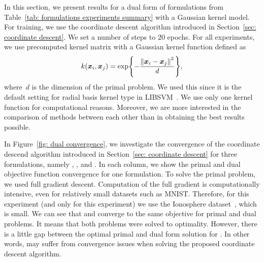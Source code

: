In this section, we present results for a dual form of formulations from Table~\ref{tab: formulations experiments summary} with a Gaussian kernel model. For training, we use the coordinate descent algorithm introduced in Section~\ref{sec: coordinate descent}. We set a number of steps to 20 epochs. For all experiments, we use precomputed kernel matrix with a Gaussian kernel function defined as 
\begin{equation*}
  k(\bm{x}_i, \bm{x}_j) = \exp\Brac[c]{- \frac{\norm{\bm{x}_i - \bm{x}_j}^2}{d}},
\end{equation*}
where~$d$ is the dimension of the primal problem. We used this since it is the default setting for radial basis kernel type in LIBSVM~\cite{chang2011libsvm}. We use only one kernel function for computational reasons. Moreover, we are more interested in the comparison of methods between each other than in obtaining the best results possible.

In Figure~\ref{fig: dual convergence}, we investigate the convergence of the coordinate descend algorithm introduced in Section~\ref{sec: coordinate descent} for three formulations, namely \TopPush, \TopPushK, and \PatMatNP. In each column, we show the primal and dual objective function convergence for one formulation. To solve the primal problem, we used full gradient descent. Computation of the full gradient is computationally intensive, even for relatively small datasets such as MNIST. Therefore, for this experiment (and only for this experiment) we use the Ionosphere dataset~\cite{sigillito1989classification}, which is small. We can see that \TopPush and \TopPushK converge to the same objective for primal and dual problems. It means that both problems were solved to optimality. However, there is a little gap between the optimal primal and dual form solution for \PatMatNP. In other words, \PatMatNP may suffer from convergence issues when solving the proposed coordinate descent algorithm.  


